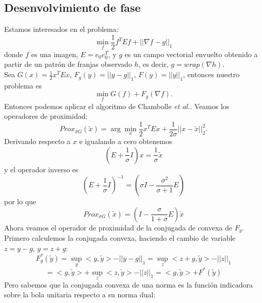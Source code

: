 \documentclass[12pt,draftcls, onecolumn, letterpaper,compsoc]{IEEEtran}
\begin{document}
\subsection{Desenvolvimiento de fase}
Estamos interesados en el problema:
\begin{equation}
    \min_{f} \frac{1}{2}f^{T}Ef + ||\nabla f - g||_1
\end{equation}
donde $f$ es una imagen, $E = e_{0}e_{0}^{T}$, y $g$ es un campo vectorial envuelto obtenido a partir de un patr\'{o}n de franjas observado $h$, es decir, $g=wrap(\nabla h)$.\\

Sea $G(x)=\frac{1}{2}x^T E x$, $F_{g}(y) = ||y-g||_1$, $F(y) = ||y||_1$, entonces nuestro problema es
\begin{equation}
    \min_{f} G(f) + F_{g}(\nabla f).
\end{equation}
Entonces podemos aplicar el algoritmo de Chambolle {\it et al.}. Veamos los operadores de proximidad:
\begin{equation}
    Prox_{\sigma G}(\tilde{x}) = \arg\min_{x} \frac{1}{2}x^T E x + \frac{1}{2\sigma} ||x-\tilde{x}||_{2}^{2}.
\end{equation}
Derivando respecto a $x$ e igualando a cero obtenemos
\begin{equation}
    \left(E+\frac{1}{\sigma}I\right)x = \frac{1}{\sigma}\tilde{x}
\end{equation}
y el operador inverso es
\begin{equation}
    \left(E+\frac{1}{\sigma}I\right)^{-1} = \left(\sigma I - \frac{\sigma^{2}}{\sigma + 1}E \right)
\end{equation}
por lo que
\begin{displaymath}
    Prox_{\sigma G}(\tilde{x}) = \left( I-\frac{\sigma}{1+\sigma}E \right)\tilde{x}
\end{displaymath}
Ahora veamos el operador de proximidad de la conjugada de convexa de $F_g$. Primero calculemos la conjugada convexa, haciendo el cambio de variable $z=y-g$, $y=z+g$:
\begin{displaymath}
    F^{*}_{g}(\tilde{y}) = \sup_{y} <y, \tilde{y}> - ||y-g||_{1} = \sup_{z} <z+g, \tilde{y}> - ||z||_{1}
\end{displaymath}
\begin{displaymath}
    =<g, \tilde{y}> + \sup_{z} <z, \tilde{y}> - ||z||_{1} = <g, \tilde{y}> + F^{*}(\tilde{y})
\end{displaymath}
Pero sabemos que la conjugada convexa de una norma es la funci\'{o}n indicadora sobre la bola unitaria respecto a su norma dual:
\end{document}
